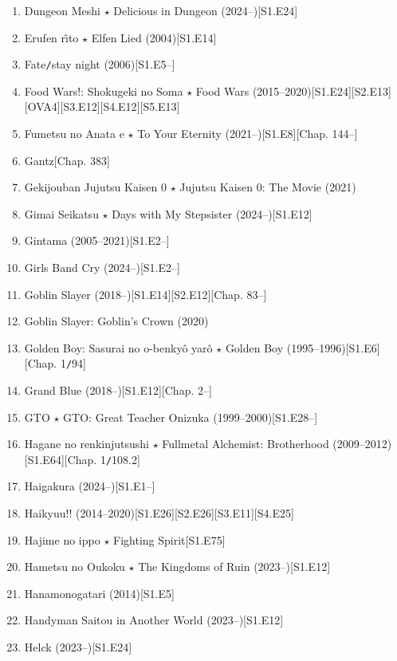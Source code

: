 \documentclass{article}
\begin{document}
\begin{enumerate}
    \item {\sc Dungeon Meshi $\star$ Delicious in Dungeon} (2024--)\hfill[S1.E24]
    \item {\sc Erufen r\^{\i}to $\star$ Elfen Lied} (2004)\hfill[S1.E14]
    \item Fate{\tt/}stay night (2006)\hfill[S1.E5--]
    \item {\sc Food Wars!: Shokugeki no Soma $\star$ Food Wars} (2015--2020)\hfill[S1.E24][S2.E13][OVA4][S3.E12][S4.E12][S5.E13]
    \item Fumetsu no Anata e $\star$ To Your Eternity (2021--)\hfill[S1.E8][Chap. 144--]
    \item {\sc Gantz}\hfill[Chap. 383]
    \item {\sc Gekijouban Jujutsu Kaisen 0 $\star$ Jujutsu Kaisen 0: The Movie} (2021)
    \item {\sc Gimai Seikatsu $\star$ Days with My Stepsister} (2024--)\hfill[S1.E12]
    \item Gintama (2005--2021)\hfill[S1.E2--]
    \item Girls Band Cry (2024--)\hfill[S1.E2--]
    \item {\sc Goblin Slayer} (2018--)\hfill[S1.E14][S2.E12][Chap. 83--]
    \item {\sc Goblin Slayer: Goblin's Crown} (2020)
    \item {\sc Golden Boy: Sasurai no o-benky\^o yar\^o $\star$ Golden Boy} (1995--1996)\hfill[S1.E6][Chap. 1{\tt/}94]
    \item Grand Blue (2018--)\hfill[S1.E12][Chap. 2--]
    \item GTO $\star$ GTO: Great Teacher Onizuka (1999--2000)\hfill[S1.E28--]
    \item {\sc Hagane no renkinjutsushi $\star$ Fullmetal Alchemist: Brotherhood} (2009--2012)\hfill[S1.E64][Chap. 1{\tt/}108.2]
    \item Haigakura (2024--)\hfill[S1.E1--]
    \item {\sc Haikyuu!!} (2014--2020)\hfill[S1.E26][S2.E26][S3.E11][S4.E25]
    \item {\sc Hajime no ippo $\star$ Fighting Spirit}\hfill[S1.E75]
    \item {\sc Hametsu no Oukoku $\star$ The Kingdoms of Ruin} (2023--)\hfill[S1.E12]
    \item {\sc Hanamonogatari} (2014)\hfill[S1.E5]
    \item {\sc Handyman Saitou in Another World} (2023--)\hfill[S1.E12]
    \item {\sc Helck} (2023--)\hfill[S1.E24]

\end{enumerate}
\end{document}
